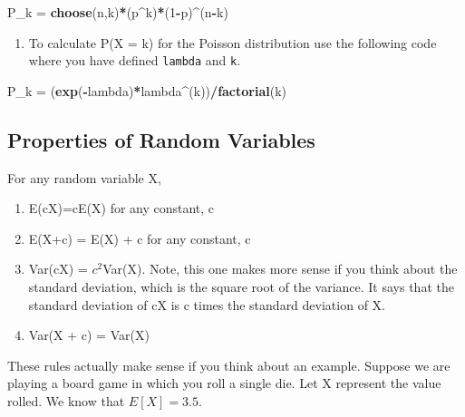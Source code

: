 \documentclass[]{article}
\newenvironment{Shaded}{\begin{snugshade}}{\end{snugshade}}
\newcommand{\DecValTok}[1]{\textcolor[rgb]{0.00,0.00,0.81}{#1}}
\newcommand{\KeywordTok}[1]{\textcolor[rgb]{0.13,0.29,0.53}{\textbf{#1}}}
\newcommand{\NormalTok}[1]{#1}
\newcommand{\OperatorTok}[1]{\textcolor[rgb]{0.81,0.36,0.00}{\textbf{#1}}}
\newcommand{\StringTok}[1]{\textcolor[rgb]{0.31,0.60,0.02}{#1}}
\providecommand{\tightlist}{%
  \setlength{\itemsep}{0pt}\setlength{\parskip}{0pt}}
\begin{document}
\begin{Shaded}
\begin{Highlighting}[]
\NormalTok{P_k =}\StringTok{ }\KeywordTok{choose}\NormalTok{(n,k)}\OperatorTok{*}\NormalTok{(p}\OperatorTok{^}\NormalTok{k)}\OperatorTok{*}\NormalTok{(}\DecValTok{1}\OperatorTok{-}\NormalTok{p)}\OperatorTok{^}\NormalTok{(n}\OperatorTok{-}\NormalTok{k)}
\end{Highlighting}
\end{Shaded}

\begin{enumerate}
\def\labelenumi{\alph{enumi})}
\setcounter{enumi}{1}
\tightlist
\item
  To calculate P(X = k) for the Poisson distribution use the following
  code where you have defined \texttt{lambda} and \texttt{k}.
\end{enumerate}

\begin{Shaded}
\begin{Highlighting}[]
\NormalTok{P_k =}\StringTok{ }\NormalTok{(}\KeywordTok{exp}\NormalTok{(}\OperatorTok{-}\NormalTok{lambda)}\OperatorTok{*}\NormalTok{lambda}\OperatorTok{^}\NormalTok{(k))}\OperatorTok{/}\KeywordTok{factorial}\NormalTok{(k)}
\end{Highlighting}
\end{Shaded}

\hypertarget{properties-of-random-variables}{%
\subsection{Properties of Random
Variables}\label{properties-of-random-variables}}

For any random variable X,

\begin{enumerate}
\def\labelenumi{\arabic{enumi}.}
\item
  E(cX)=cE(X) for any constant, c
\item
  E(X+c) = E(X) + c for any constant, c
\item
  Var(cX) = \(c^2\)Var(X). Note, this one makes more sense if you think
  about the standard deviation, which is the square root of the
  variance. It says that the standard deviation of cX is
  \textbar c\textbar{} times the standard deviation of X.
\item
  Var(X + c) = Var(X)
\end{enumerate}

These rules actually make sense if you think about an example. Suppose
we are playing a board game in which you roll a single die. Let X
represent the value rolled. We know that \(E[X]=3.5\).
\end{document}
